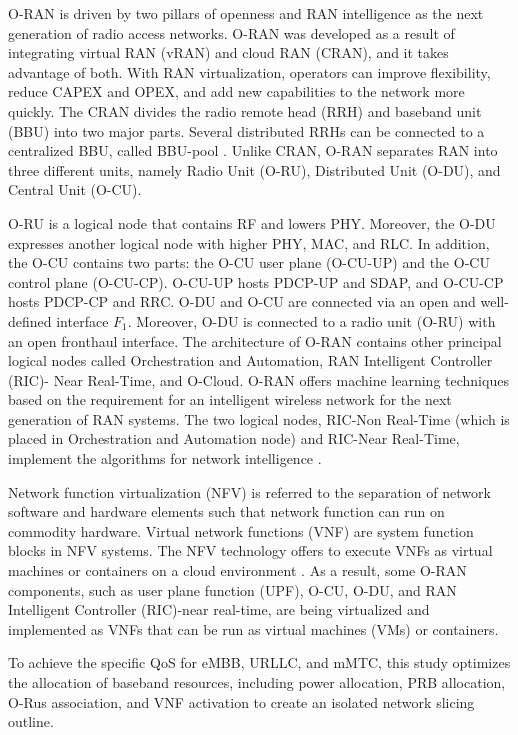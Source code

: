 \documentclass[lettersize,journal]{IEEEtran}
\begin{document}
O-RAN is driven by two pillars of openness and RAN intelligence as the next generation of radio access networks. O-RAN was developed as a result of integrating virtual RAN (vRAN) and cloud RAN (CRAN), and it takes advantage of both. With RAN virtualization, operators can improve flexibility, reduce CAPEX and OPEX, and add new capabilities to the network more quickly. The CRAN divides the radio remote head (RRH) and baseband unit (BBU) into two major parts. Several distributed RRHs can be connected to a centralized BBU, called BBU-pool \cite{han2019research}. Unlike CRAN, O-RAN separates RAN into three different units, namely Radio Unit (O-RU), Distributed Unit (O-DU), and Central Unit (O-CU). 

O-RU is a logical node that contains RF and lowers PHY. Moreover, the O-DU expresses another logical node with higher PHY, MAC, and RLC.
In addition, the O-CU contains two parts: the O-CU user plane (O-CU-UP) and the O-CU control plane (O-CU-CP). O-CU-UP hosts PDCP-UP and SDAP, and O-CU-CP hosts PDCP-CP and RRC.
O-DU and O-CU are connected via an open and well-defined interface $F_1$.
Moreover, O-DU is connected to a radio unit (O-RU) with an open fronthaul interface.
The architecture of O-RAN contains other principal logical nodes called Orchestration and Automation, RAN Intelligent Controller (RIC)- Near Real-Time, and O-Cloud. 
O-RAN offers machine learning techniques based on the requirement for an intelligent wireless network for the next generation of RAN systems. The two logical nodes, RIC-Non Real-Time (which is placed in Orchestration and Automation node) and RIC-Near Real-Time, implement the algorithms for network intelligence 
\cite{gavrilovska2020cloud,niknam2020intelligent,kazemifard2021minimum,both2021system,ORANArch,ORANML,lin2021toward}.

Network function virtualization (NFV) is referred to the separation of network software and hardware elements such that network function can run on commodity hardware. Virtual network functions (VNF) are system function blocks in NFV systems. The NFV technology offers to execute VNFs as virtual machines or containers on a cloud environment \cite{mijumbi2015network, luo2020online}.
As a result, some O-RAN components, such as user plane function (UPF), O-CU, O-DU, and RAN Intelligent Controller (RIC)-near real-time, are being virtualized and implemented as VNFs that can be run as virtual machines (VMs) or containers.

To achieve the specific QoS for eMBB, URLLC, and mMTC, this study optimizes the allocation of baseband resources, including power allocation, PRB allocation, O-Rus association, and VNF activation to create an isolated network slicing outline.
\end{document}
